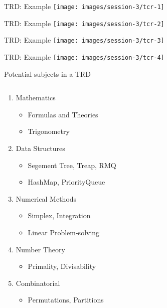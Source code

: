 \documentclass[11pt,pdf, aspectratio=169]{beamer}
\begin{document}
  \begin{frame}{TRD: Example}
    \texttt{[image: images/session-3/tcr-1]}
  \end{frame}
  \begin{frame}{TRD: Example}
    \texttt{[image: images/session-3/tcr-2]}
  \end{frame}
  \begin{frame}{TRD: Example}
    \texttt{[image: images/session-3/tcr-3]}
  \end{frame}
  \begin{frame}{TRD: Example}
    \texttt{[image: images/session-3/tcr-4]}
  \end{frame}
  \begin{frame}{Potential subjects in a TRD}
    \begin{columns}
      \begin{column}{.45\textwidth}
        \begin{enumerate}
          \item Mathematics
          \begin{itemize}
            \item Formulas and Theories
            \item Trigonometry
          \end{itemize}
          \item Data Structures
          \begin{itemize}
            \item Segement Tree, Treap, RMQ
            \item HashMap, PriorityQueue
          \end{itemize}
          \item Numerical Methods
          \begin{itemize}
            \item Simplex, Integration
            \item Linear Problem-solving
          \end{itemize}
          \item Number Theory
          \begin{itemize}
            \item Primality, Divisability
          \end{itemize}
          \item Combinatorial
          \begin{itemize}
            \item Permutations, Partitions

\end{itemize}
\end{enumerate}
\end{column}
\end{columns}
\end{frame}
\end{document}
